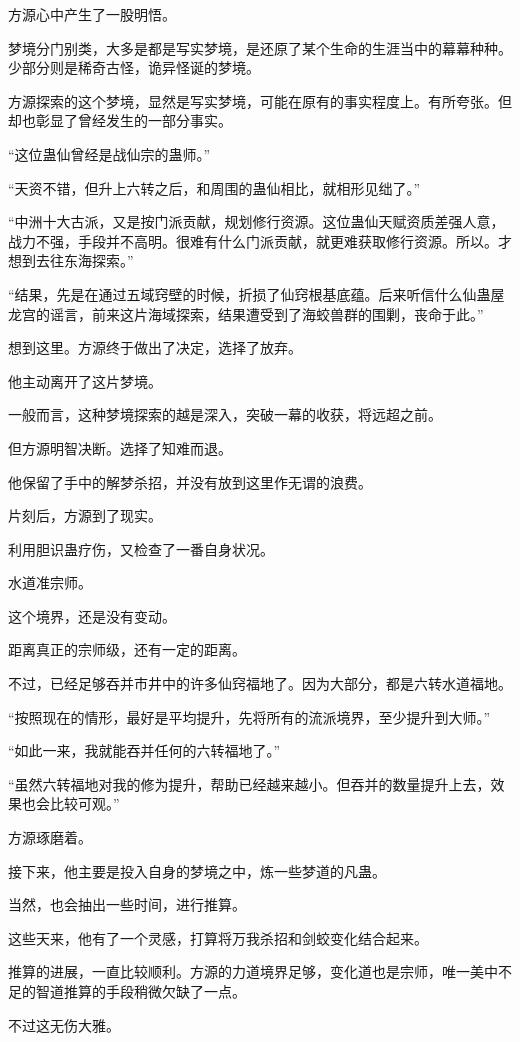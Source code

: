 \begin{this_body}
方源心中产生了一股明悟。

梦境分门别类，大多是都是写实梦境，是还原了某个生命的生涯当中的幕幕种种。少部分则是稀奇古怪，诡异怪诞的梦境。

方源探索的这个梦境，显然是写实梦境，可能在原有的事实程度上。有所夸张。但却也彰显了曾经发生的一部分事实。

“这位蛊仙曾经是战仙宗的蛊师。”

“天资不错，但升上六转之后，和周围的蛊仙相比，就相形见绌了。”

“中洲十大古派，又是按门派贡献，规划修行资源。这位蛊仙天赋资质差强人意，战力不强，手段并不高明。很难有什么门派贡献，就更难获取修行资源。所以。才想到去往东海探索。”

“结果，先是在通过五域窍壁的时候，折损了仙窍根基底蕴。后来听信什么仙蛊屋龙宫的谣言，前来这片海域探索，结果遭受到了海蛟兽群的围剿，丧命于此。”

想到这里。方源终于做出了决定，选择了放弃。

他主动离开了这片梦境。

一般而言，这种梦境探索的越是深入，突破一幕的收获，将远超之前。

但方源明智决断。选择了知难而退。

他保留了手中的解梦杀招，并没有放到这里作无谓的浪费。

片刻后，方源到了现实。

利用胆识蛊疗伤，又检查了一番自身状况。

水道准宗师。

这个境界，还是没有变动。

距离真正的宗师级，还有一定的距离。

不过，已经足够吞并市井中的许多仙窍福地了。因为大部分，都是六转水道福地。

“按照现在的情形，最好是平均提升，先将所有的流派境界，至少提升到大师。”

“如此一来，我就能吞并任何的六转福地了。”

“虽然六转福地对我的修为提升，帮助已经越来越小。但吞并的数量提升上去，效果也会比较可观。”

方源琢磨着。

接下来，他主要是投入自身的梦境之中，炼一些梦道的凡蛊。

当然，也会抽出一些时间，进行推算。

这些天来，他有了一个灵感，打算将万我杀招和剑蛟变化结合起来。

推算的进展，一直比较顺利。方源的力道境界足够，变化道也是宗师，唯一美中不足的智道推算的手段稍微欠缺了一点。

不过这无伤大雅。


\end{this_body}
